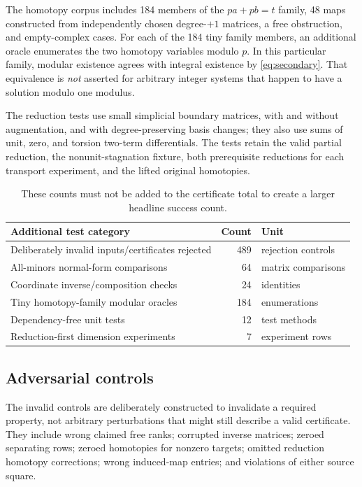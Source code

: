 \documentclass[11pt,letterpaper]{article}
\theoremstyle{definition}\newtheorem{definition}[theorem]{Definition}
\theoremstyle{remark}\newtheorem{remark}[theorem]{Remark}
\begin{document}
The homotopy corpus includes 184 members of the $pa+pb=t$ family, 48 maps
constructed from independently chosen degree-$+1$ matrices, a free obstruction,
and empty-complex cases. For each of the 184 tiny family members, an additional
oracle enumerates the two homotopy variables modulo $p$. In this particular
family, modular existence agrees with integral existence by
\eqref{eq:secondary}. That equivalence is \emph{not} asserted for arbitrary
integer systems that happen to have a solution modulo one modulus.

The reduction tests use small simplicial boundary matrices, with and without
augmentation, and with degree-preserving basis changes; they also use sums of
unit, zero, and torsion two-term differentials. The tests retain the valid
partial reduction, the nonunit-stagnation fixture, both prerequisite reductions
for each transport experiment, and the lifted original homotopies.

\begin{table}[ht]
\centering\small
\begin{tabularx}{\textwidth}{@{}Xrl@{}}
\toprule
Additional test category & Count & Unit\\
\midrule
Deliberately invalid inputs/certificates rejected & 489 & rejection controls\\
All-minors normal-form comparisons & 64 & matrix comparisons\\
Coordinate inverse/composition checks & 24 & identities\\
Tiny homotopy-family modular oracles & 184 & enumerations\\
Dependency-free unit tests & 12 & test methods\\
Reduction-first dimension experiments & 7 & experiment rows\\
\bottomrule
\end{tabularx}
\caption{These counts must not be added to the certificate total to create a
larger headline success count.}
\end{table}

\subsection{Adversarial controls}
The invalid controls are deliberately constructed to invalidate a required
property, not arbitrary perturbations that might still describe a valid
certificate. They include wrong claimed free ranks; corrupted inverse matrices;
zeroed separating rows; zeroed homotopies for nonzero targets; omitted reduction
homotopy corrections; wrong induced-map entries; and violations of either source
square.
\end{document}
